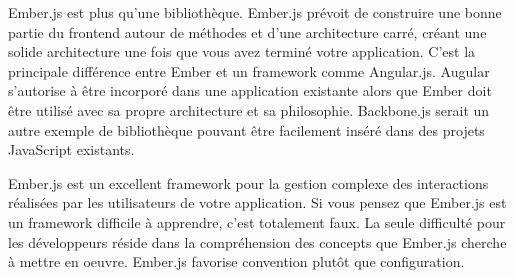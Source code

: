 Ember.js est plus qu’une bibliothèque. Ember.js prévoit de construire une bonne partie du frontend autour de méthodes et d’une architecture carré, créant une solide architecture une fois que vous avez terminé votre application. C’est la principale différence entre Ember et un framework comme Angular.js. Augular s’autorise à être incorporé dans une application existante alors que Ember doit être utilisé avec sa propre architecture et sa philosophie. Backbone.js serait un autre exemple de bibliothèque pouvant être facilement inséré dans des projets JavaScript existants.

Ember.js est un excellent framework pour la gestion complexe des interactions réalisées par les utilisateurs de votre application. Si vous pensez que Ember.js est un framework difficile à apprendre, c’est totalement faux. La seule difficulté pour les développeurs réside dans la compréhension des concepts que Ember.js cherche à mettre en oeuvre. Ember.js favorise convention plutôt que configuration.
